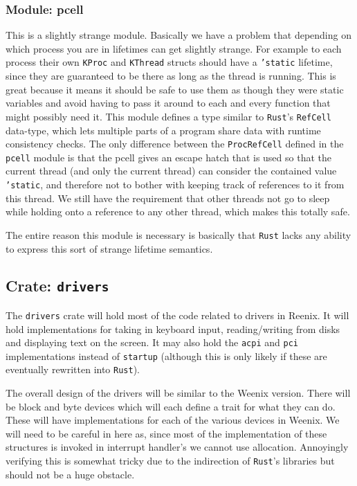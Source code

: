 \documentclass[12pt,letterpaper]{article}
\newcommand{\rust}{\texttt{Rust}}
\begin{document}
\subsubsection{Module: pcell}
This is a slightly strange module. Basically we have a problem that
depending on which process you are in lifetimes can get slightly
strange. For example to each process their own \texttt{KProc} and
\texttt{KThread} structs should have a \texttt{'static} lifetime, since
they are guaranteed to be there as long as the thread is running. This
is great because it means it should be safe to use them as though they
were static variables and avoid having to pass it around to each and
every function that might possibly need it. This module defines a type
similar to \rust{}'s \texttt{RefCell} data-type, which lets multiple
parts of a program share data with runtime consistency checks. The only
difference between the \texttt{ProcRefCell} defined in the \texttt{pcell}
module is that the pcell gives an escape hatch that is used so that the
current thread (and only the current thread) can consider the contained
value \texttt{'static}, and therefore not to bother with keeping track
of references to it from this thread. We still have the requirement
that other threads not go to sleep while holding onto a reference to
any other thread, which makes this totally safe.

The entire reason this module is necessary is basically that \rust{}
lacks any ability to express this sort of strange lifetime semantics.

\subsection{Crate: \texttt{drivers}}
The \texttt{drivers} crate will hold most of the code related to drivers
in Reenix. It will hold implementations for taking in keyboard input,
reading/writing from disks and displaying text on the screen. It may
also hold the \texttt{acpi} and \texttt{pci} implementations instead of
\texttt{startup} (although this is only likely if these are eventually
rewritten into \rust{}).

The overall design of the drivers will be similar to the Weenix
version. There will be block and byte devices which will each define a
trait for what they can do. These will have implementations for each
of the various devices in Weenix. We will need to be careful in here
as, since most of the implementation of these structures is invoked in
interrupt handler's we cannot use allocation. Annoyingly verifying this
is somewhat tricky due to the indirection of \rust{}'s libraries but
should not be a huge obstacle.
\end{document}
